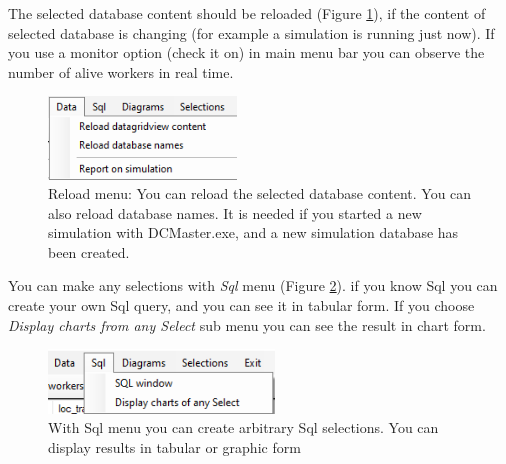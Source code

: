 \documentclass[a4paper,12pt]{article}
\begin{document}

The selected database content should be reloaded (Figure \ref{fig:mnuReloadata}), if the content of selected database is changing (for example a simulation is running just now). If you use a monitor option (check it on) in main menu bar you can observe the number of alive workers in real time.




\begin{figure}
	\begin{center}
		\includegraphics[width=5cm]{mnuReloadata.png}
		\caption{Reload menu: You can reload the selected database content. You can also reload database names. It is needed if you started a new simulation with DCMaster.exe, and a new simulation database has been created.}
		\label{fig:mnuReloadata}
	\end{center}
\end{figure}

You can make any selections with \textit{Sql} menu (Figure \ref{fig:mnusql}). if you know Sql you can create your own Sql query, and you can see it in tabular form. If you choose \textit{Display charts from any Select} sub menu you can see the result in chart form.

\begin{figure}
	\begin{center}
		\includegraphics[width=6cm]{mnusql.png}
		\caption{With Sql menu you can create arbitrary Sql selections. You can display results in tabular or graphic form}
		\label{fig:mnusql}
	\end{center}
	\end{figure}
\end{document}
